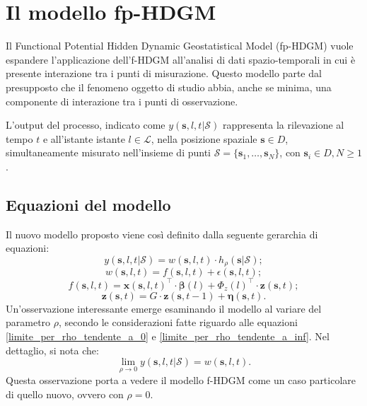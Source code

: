 \section[Il modello fp-HDGM]{Il modello fp-HDGM}
Il Functional Potential Hidden Dynamic Geostatistical Model (fp-HDGM) vuole espandere l'applicazione dell'f-HDGM all'analisi di dati spazio-temporali in cui è presente interazione tra i punti di misurazione. Questo modello parte dal presupposto che il fenomeno oggetto di studio abbia, anche se minima, una componente di interazione tra i punti di osservazione.
\par L'output del processo, indicato come $y(\mathbf{s}, l, t| \mathcal{S})$ rappresenta la rilevazione al tempo $t$ e all'istante istante $l\in\mathcal{L}$, nella posizione spaziale $\mathbf{s} \in D$, simultaneamente misurato nell'insieme di punti $\mathcal{S} = \{\mathbf{s}_1, \ldots, \mathbf{s}_N\}$, con $\mathbf{s}_i\in D, N \geq 1$.

\subsection[Equazioni del modello]{Equazioni del modello}
Il nuovo modello proposto viene così definito dalla seguente gerarchia di equazioni:
\begin{equation}
	y(\mathbf{s}, l, t| \mathcal{S}) = w(\mathbf{s}, l, t)\cdot h_\rho(\mathbf{s}|\mathcal{S});
	\label{eq_rumore_uscita_HDGM}
\end{equation}
\begin{equation}
	w(\mathbf{s}, l, t)= f(\mathbf{s}, l, t) + \epsilon(\mathbf{s}, l, t);
	\label{eq_rumore_uscita_fp_HDGM}
\end{equation}
\begin{equation}
	f(\mathbf{s}, l, t) = \mathbf{x}(\mathbf{s}, l, t)^\top\cdot\boldsymbol{\beta}(l) + \Phi_z(l)^\top\cdot\mathbf{z}(\mathbf{s}, t);
	\label{eq_comp_det_fp-HDGM}
\end{equation}
\begin{equation}
	\mathbf{z}(\mathbf{s}, t) = G\cdot \mathbf{z}(\mathbf{s}, t-1) + \boldsymbol{\eta}(\mathbf{s}, t).
	\label{eq_comp_lat_fp-HDGM}
\end{equation}
Un'osservazione interessante emerge esaminando il modello al variare del parametro $\rho$, secondo le considerazioni fatte riguardo alle equazioni \ref{limite_per_rho_tendente_a_0} e \ref{limite_per_rho_tendente_a_inf}. Nel dettaglio, si nota che:
\begin{equation}
	\lim_{\rho \to 0} y(\mathbf{s}, l, t| \mathcal{S}) = w(\mathbf{s}, l, t). \label{limite_geo-potenziale_condizionato_rho_a_0}
\end{equation}
Questa osservazione porta a vedere il modello f-HDGM come un caso particolare di quello nuovo, ovvero con $\rho=0$.

